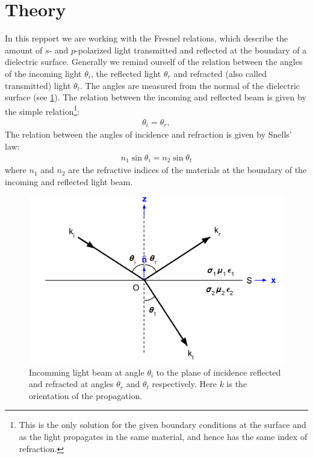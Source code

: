 \section{Theory}
In this repport we are working with the Fresnel relations, which describe the
amount of $s$- and $p$-polarized light transmitted and reflected at the
boundary of a dielectric surface. Generally we remind ourself of the relation
between the angles of the incoming light $\theta_i$, the reflected light
$\theta_r$ and refracted (also called transmitted) light $\theta_t$. The angles
are measured from the normal of the dielectric surface (see \cref{fig:angles}).
The relation between the incoming and reflected beam is given by the simple
relation\footnote{This is the only solution for the given boundary conditions at the surface and
as the light propagates in the same material, and hence has the same index of
refraction.}:
%
\begin{align}
    \theta_i = \theta_r,
\end{align}
%
The relation between the angles of incidence and refraction is given by Snells' law:%
\begin{align}
n_1\sin{\theta_i}=n_2\sin{\theta_t}
\end{align}
%
where $n_1$ and $n_2$ are the refractive indices of the materials at the boundary of the incoming and reflected light beam. 
\begin{figure}[h!]
    \centering
    \includegraphics[width=\columnwidth]{snellslaw}
    \caption{Incomming light beam at angle $\theta_i$ to the
        plane of incidence reflected and refracted
        at angles $\theta_r$ and $\theta_t$ respectively. Here $k$ is the
    orientation of the propagation.
    }\label{fig:angles}
\end{figure}

